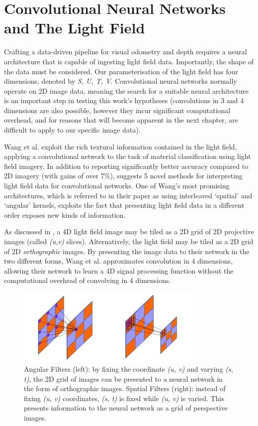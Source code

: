 \section{Convolutional Neural Networks and The Light Field}


Crafting a data-driven pipeline for visual odometry and depth requires a neural architecture that is capable of ingesting light field data. Importantly, the shape of the data must be considered. Our parameterisation of the light field has four dimensions, denoted by \textit{S, U, T, V}. Convolutional neural networks normally operate on 2D image data, meaning the search for a suitable neural architecture is an important step in testing this work's hypotheses (convolutions in 3 and 4 dimensions are also possible, however they incur significant computational overhead, and for reasons that will become apparent in the next chapter, are difficult to apply to our specific image data).


Wang et al. \cite{wang2016lfcnn} exploit the rich textural information contained in the light field, applying a convolutional network to the task of material classification using light field imagery. In addition to reporting significantly better accuracy compared to 2D imagery (with gains of over 7\%), \cite{wang2016lfcnn} suggests 5 novel methods for interpreting light field data for convolutional networks. One of Wang's most promising architectures, which is referred to in their paper as using interleaved `spatial' and `angular' kernels, exploits the fact that presenting light field data in a different order exposes new kinds of information. 

As discussed in \cite{dansereau2014phd}, a 4D light field image may be tiled as a 2D grid of 2D projective images (called \textit{(u,v)} slices). Alternatively, the light field may be tiled as a 2D grid of 2D \textit{orthographic} images. By presenting the image data to their network in the two different forms, Wang et al. approximates convolution in 4 dimensions, allowing their network to learn a 4D signal processing function without the computational overhead of convolving in 4 dimensions.

\begin{figure}
    \centering 
    \includegraphics[width=3.5in]{images/spatial-angular.png}
    \caption{Angular Filters (left): by fixing the coordinate \textit{(u, v)} and varying \textit{(s, t)}, the 2D grid of images can be presented to a neural network in the form of orthographic images. Spatial Filters (right): instead of fixing \textit{(u, v)} coordinates, \textit{(s, t)} is fixed while \textit{(u, v)} is varied. This presents information to the neural network as a grid of perspective images.}
    \label{spatial-angular}
\end{figure}



